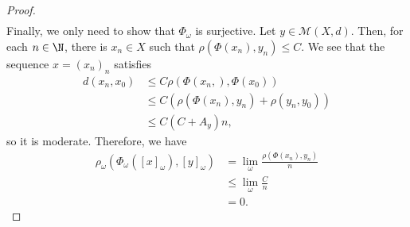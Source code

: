 \documentclass[10pt]{mypackage}
\begin{document}
\begin{proof}
\begin{align*}
  \end{align*}
  Finally, we only need to show that $\Phi_{\omega}$ is surjective. Let $y\in \mathcal{M}\left( X,d \right)$. Then, for each $n\in \N$, there is $x_n\in X$ such that $\rho\left( \Phi\left( x_n \right),y_n \right)\leq C$. We see that the sequence $x = \left( x_n \right)_n$ satisfies
  \begin{align*}
    d\left( x_n,x_0 \right) &\leq C\rho\left( \Phi\left( x_n, \right),\Phi\left( x_0 \right) \right)\\
                            &\leq C\left( \rho\left( \Phi\left( x_n \right),y_n \right) + \rho\left( y_n,y_0 \right) \right)\\
                            &\leq C\left( C + A_y \right)n,
  \end{align*}
  so it is moderate. Therefore, we have
  \begin{align*}
    \rho_{\omega}\left( \Phi_{\omega}\left( \left[ x \right]_{\omega} \right),\left[ y \right]_{\omega} \right) &= \lim_{\omega} \frac{\rho\left( \Phi\left( x_n \right),y_n \right)}{n}\\
              &\leq \lim_{\omega} \frac{C}{n}\\
              &= 0.
  \end{align*}
\end{proof}
\end{document}
